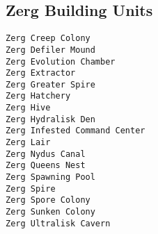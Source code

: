 \subsection{Zerg Building Units}
\verb|Zerg Creep Colony| \\
\verb|Zerg Defiler Mound| \\
\verb|Zerg Evolution Chamber| \\
\verb|Zerg Extractor| \\
\verb|Zerg Greater Spire| \\
\verb|Zerg Hatchery| \\
\verb|Zerg Hive| \\
\verb|Zerg Hydralisk Den| \\
\verb|Zerg Infested Command Center| \\
\verb|Zerg Lair| \\
\verb|Zerg Nydus Canal| \\
\verb|Zerg Queens Nest| \\
\verb|Zerg Spawning Pool| \\
\verb|Zerg Spire| \\
\verb|Zerg Spore Colony| \\
\verb|Zerg Sunken Colony| \\
\verb|Zerg Ultralisk Cavern|
